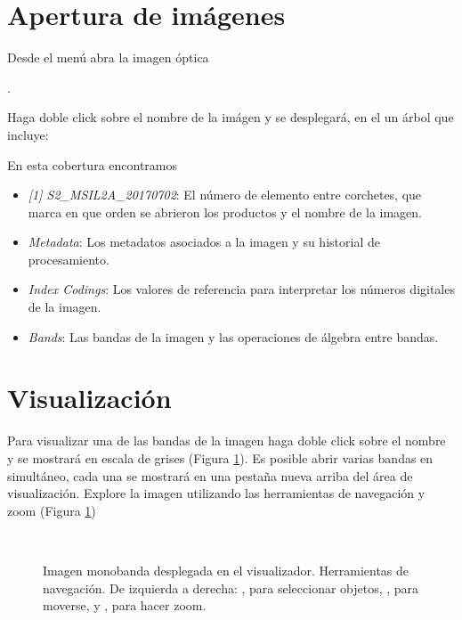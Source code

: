 \section{Apertura de imágenes}

Desde el menú  abra la imagen óptica
\begin{center} .
\end{center}
Haga doble click sobre el nombre de la imágen y se desplegará, en el  un árbol que incluye:
\\

En esta cobertura encontramos

\begin{itemize}
    \item \emph{[1] S2\_MSIL2A\_20170702}: El número de elemento entre corchetes, que marca en que orden se abrieron los productos y el nombre de la imagen.
    \item \emph{Metadata}: Los metadatos asociados a la imagen y su historial de procesamiento.
    \item \emph{Index Codings}: Los valores de referencia para interpretar los números digitales de la imagen.
    \item \emph{Bands}: Las bandas de la imagen y las operaciones de álgebra entre bandas.
\end{itemize}

\section{Visualización}

Para visualizar una de las bandas de la imagen haga doble click sobre el nombre y se mostrará en escala de grises (Figura \ref{fig:mono}). Es posible abrir varias bandas en simultáneo, cada una se mostrará en una pestaña nueva arriba del área de visualización. Explore la imagen utilizando las herramientas de navegación y zoom (Figura \ref{fig:mono})

\begin{figure}[h!]
    \centering
    \\
    \caption{Imagen monobanda desplegada en el visualizador. Herramientas de navegación. De izquierda a derecha: , para seleccionar objetos, , para moverse, y , para hacer zoom.}
    \label{fig:mono}
\end{figure}


